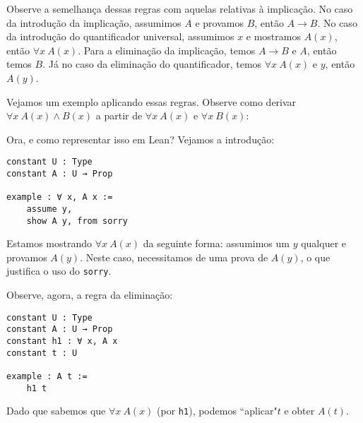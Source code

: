         Observe a semelhança dessas regras com aquelas relativas à implicação. No caso da introdução da implicação, assumimos $A$ e provamos $B$, então $A \rightarrow B$.
        No caso da introdução do quantificador universal, assumimos $x$ e mostramos $A(x)$, então $\forall x \ A(x)$.
        Para a eliminação da implicação, temos $A \rightarrow B$ e $A$, então temos $B$. Já no caso da eliminação do quantificador, temos $\forall x \ A(x)$ e $y$, então $A(y)$.

        Vejamos um exemplo aplicando essas regras. Observe como derivar $\forall x \ A(x) \land B(x)$ a partir de $\forall x \ A(x)$ e $\forall x \ B(x)$:

        \begin{center}
            \begin{bprooftree}
            \end{bprooftree}
        \end{center}

        Ora, e como representar isso em Lean? Vejamos a introdução:

        \begin{lstlisting}
constant U : Type
constant A : U → Prop

example : ∀ x, A x :=
    assume y,
    show A y, from sorry
\end{lstlisting}

        Estamos mostrando $\forall x \ A(x)$ da seguinte forma: assumimos um $y$ qualquer e provamos $A(y)$.
Neste caso, necessitamos de uma prova de $A(y)$, o que justifica o uso do \lstinline{sorry}.

        Observe, agora, a regra da eliminação:

        \begin{lstlisting}
constant U : Type
constant A : U → Prop
constant h1 : ∀ x, A x
constant t : U

example : A t :=
    h1 t
\end{lstlisting}

        Dado que sabemos que $\forall x \ A(x)$ (por \lstinline{h1}), podemos ``aplicar"\space $t$ e obter $A(t)$.

